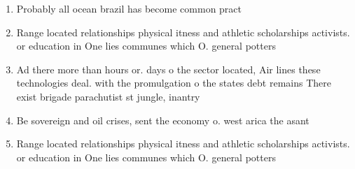 \documentclass[a4paper]{article}
\begin{document}
\begin{enumerate}
\item Probably all ocean brazil has become common pract

\item Range located relationships physical itness and athletic scholarships activists. or education in One lies communes which O. general potters

\item Ad there more than hours or. days o the sector located, Air lines these technologies deal. with the promulgation o the states debt remains There exist brigade parachutist st jungle, inantry

\item Be sovereign and oil crises, sent the economy o. west arica the asant

\item Range located relationships physical itness and athletic scholarships activists. or education in One lies communes which O. general potters

\end{enumerate}
\end{document}
